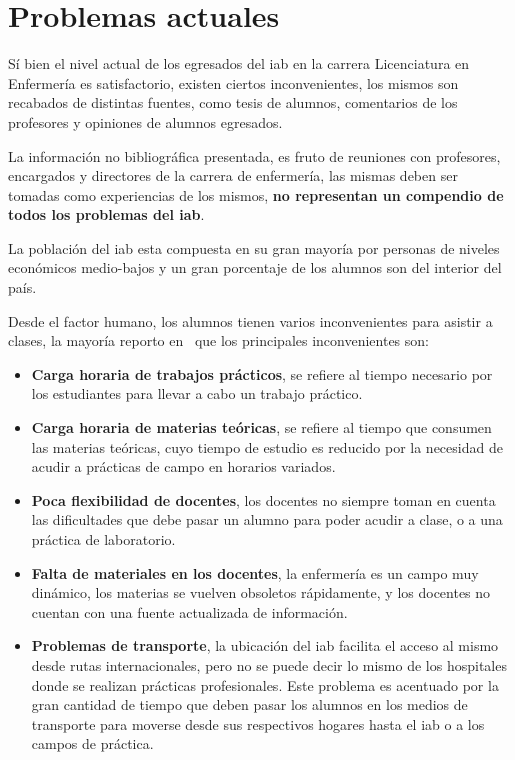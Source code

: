 \section{Problemas actuales}
\label{sec:problemas_actuales}

Sí bien el nivel actual de los egresados del \Gls{iab} en la carrera
Licenciatura en Enfermería es satisfactorio, existen ciertos inconvenientes, los
mismos son recabados de distintas fuentes, como tesis de
alumnos\cite{iab:tesis_alumnos}, comentarios de los profesores y opiniones de
alumnos egresados.

La información no bibliográfica presentada, es fruto de reuniones con
profesores, encargados y directores de la carrera de enfermería, las mismas
deben ser tomadas como experiencias de los mismos, \textbf{no representan un
    compendio de todos los problemas del \Gls{iab}}.

La población del \Gls{iab} esta compuesta en su gran mayoría por personas de
niveles económicos medio-bajos y un gran porcentaje de los alumnos son del
interior del país.

Desde el factor humano, los alumnos tienen varios inconvenientes para asistir a
clases, la mayoría reporto en~\cite{iab:tesis_alumnos} que los principales
inconvenientes son:

\begin{itemize}
    \item \textbf{Carga horaria de trabajos prácticos}, se refiere al tiempo necesario
        por los estudiantes para llevar a cabo un trabajo práctico. 
    \item \textbf{Carga horaria de materias teóricas}, se refiere al tiempo que consumen
        las materias teóricas, cuyo tiempo de estudio es reducido por la
        necesidad de acudir a prácticas de campo en horarios variados.
    \item \textbf{Poca flexibilidad de docentes}, los docentes no siempre toman en cuenta
        las dificultades que debe pasar un alumno para poder acudir a clase, o a
        una práctica de laboratorio.
    \item \textbf{Falta de materiales en los docentes}, la enfermería es un campo muy
        dinámico, los materias se vuelven obsoletos rápidamente, y los docentes
        no cuentan con una fuente actualizada de información.
    \item \textbf{Problemas de transporte}, la ubicación del \Gls{iab} facilita el acceso al
        mismo desde rutas internacionales, pero no se puede decir lo mismo de
        los hospitales donde se realizan prácticas profesionales. Este problema
        es acentuado por la gran cantidad de tiempo que deben pasar los alumnos
        en los medios de transporte para moverse desde sus respectivos hogares
        hasta el \Gls{iab} o a los campos de práctica.
\end{itemize}

